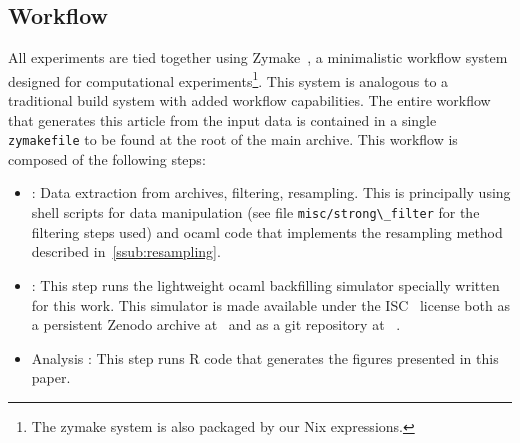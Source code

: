 \documentclass[sigconf]{acmart}
\begin{document}
 \subsection{Workflow}

 All experiments are tied together using Zymake~\cite{zymake}, a minimalistic
 workflow system designed for computational experiments\footnote{The zymake system
 is also packaged by our Nix expressions.}. This system is
 analogous to a traditional build system with added workflow capabilities. The
 entire workflow that generates this article from the input data is contained
 in a single \lstinline[basicstyle=\ttfamily\color{blue}]|zymakefile| to be
 found at the root of the main archive. This workflow is composed of the
 following steps:

 \begin{itemize}
   \item[Preprocessing]: Data extraction from archives, filtering, resampling.
     This is principally using shell scripts for data manipulation (see file
     \lstinline[basicstyle=\ttfamily\color{blue}]|misc/strong\_filter| for the
     filtering steps used) and ocaml code that implements the resampling method
     described in~\ref{ssub:resampling}.

   \item[Simulation]: This step runs the lightweight ocaml backfilling
     simulator specially written for this work. This simulator is made
     available under the ISC~\cite{ISC} license both as a persistent Zenodo
     archive at~\cite{ocst} and as a git repository at ~\cite{ocstgit}.

   \item[Analysis]: This step runs R code that generates the figures
     presented in this paper.
 \end{itemize}
\end{document}
